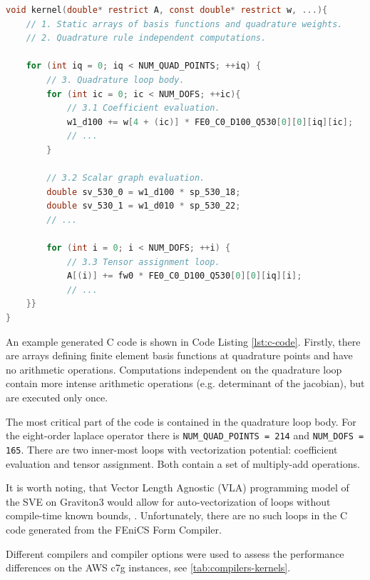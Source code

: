 \lstset{style=CStyle}
\begin{lstlisting}[language=c,
    caption=FFCx generated finite element kernel.,
    basicstyle=\ttfamily\footnotesize,
    keywordstyle=\ttb\color{deepblue}\footnotesize,
    label=lst:c-code]
void kernel(double* restrict A, const double* restrict w, ...){
    // 1. Static arrays of basis functions and quadrature weights.
    // 2. Quadrature rule independent computations.

    for (int iq = 0; iq < NUM_QUAD_POINTS; ++iq) {
        // 3. Quadrature loop body.
        for (int ic = 0; ic < NUM_DOFS; ++ic){
            // 3.1 Coefficient evaluation.
            w1_d100 += w[4 + (ic)] * FE0_C0_D100_Q530[0][0][iq][ic];
            // ...
        }

        // 3.2 Scalar graph evaluation.
        double sv_530_0 = w1_d100 * sp_530_18;
        double sv_530_1 = w1_d010 * sp_530_22;
        // ...

        for (int i = 0; i < NUM_DOFS; ++i) {
            // 3.3 Tensor assignment loop.
            A[(i)] += fw0 * FE0_C0_D100_Q530[0][0][iq][i];
            // ...
    }}
}
\end{lstlisting}

An example generated C code is shown in Code Listing \ref{lst:c-code}. Firstly,
there are arrays defining finite element basis functions at quadrature points
and have no arithmetic operations. Computations independent on the quadrature
loop contain more intense arithmetic operations (e.g. determinant of the
jacobian), but are executed only once.

The most critical part of the code is contained in the quadrature loop body. For
the eight-order laplace operator there is \lstinline{NUM_QUAD_POINTS = 214} and
\lstinline{NUM_DOFS = 165}. There are two inner-most loops with vectorization
potential: coefficient evaluation and tensor assignment. Both contain a set of
multiply-add operations.

It is worth noting, that Vector Length Agnostic (VLA) programming model of the
SVE on Graviton3 would allow for auto-vectorization of loops without compile-time
known bounds, \citep{svevla2020}. Unfortunately, there are no such loops in the C code
generated from the FEniCS Form Compiler.

Different compilers and compiler options were used to assess the performance
differences on the AWS c7g instances, see \autoref{tab:compilers-kernels}.

